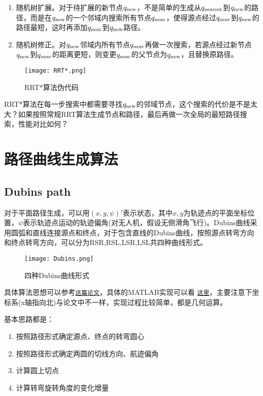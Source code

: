 \begin{enumerate}
    \item 随机树扩展。对于待扩展的新节点$q_\rm{new}$，不是简单的生成从$q_\rm{nearest}$到$q_\rm{new}$的路径，而是在$q_\rm{new}$的一个邻域内搜索所有节点$q_\rm{near}$，使得源点经过$q_\rm{near}$到$q_\rm{new}$的路径最短，这时再添加$q_\rm{near}$到$q_\rm{new}$路径。
    \item 随机树修正。对$q_\rm{new}$邻域内所有节点$q_\rm{near}$再做一次搜索，若源点经过新节点$q_\rm{new}$到$q_\rm{near}$的距离更短，则变更$q_\rm{near}$的父节点为$q_\rm{new}$，且替换原路径。
\end{enumerate}

\begin{figure}[htbp]
	\figskip 
	\centering
	\texttt{[image: RRT*.png]}	  
	\caption{\label{fig: RRT*} RRT*算法伪代码}
\end{figure}


RRT*算法在每一步搜索中都需要寻找$q_\rm{new}$的邻域节点，这个搜索的代价是不是太大？如果按照常规RRT算法生成节点和路径，最后再做一次全局的最短路径搜索，性能对比如何？

\section{路径曲线生成算法}
\subsection{Dubins path}
对于平面路径生成，可以用$(x,y,\psi)'$表示状态，其中$x,y$为轨迹点的平面坐标位置，$\psi$表示轨迹点运动的轨迹偏角(对无人机，假设无侧滑角飞行)。Dubins曲线采用圆弧和直线连接源点和终点，对于包含直线的Dubins曲线，按照源点转弯方向和终点转弯方向，可以分为RSR,RSL,LSR,LSL共四种曲线形式。

\begin{figure}[htbp]
	\figskip 
	\centering
	\texttt{[image: Dubins.png]}	  
	\caption{\label{fig: Dubins} 四种Dubins曲线形式}
\end{figure}

具体算法思想可以参考\href{/attachment/Dubins.pdf}{\texttt{这篇论文}}，具体的MATLAB实现可以看
\href{/attachment/dubins.m}{\texttt{这里}}，主要注意下坐标系(x轴指向北)与论文中不一样，实现过程比较简单，都是几何运算。

基本思路都是：
\begin{enumerate}
	\item 按照路径形式确定源点、终点的转弯圆心
	\item 按照路径形式确定两圆的切线方向、航迹偏角
	\item 计算圆上切点
	\item 计算转弯旋转角度的变化增量
\end{enumerate}

